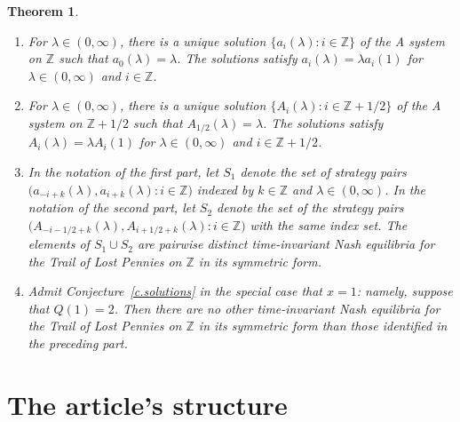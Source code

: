 \documentclass[letterpaper,11pt,oneside,reqno]{amsbook}
\newcommand{\Z}{\ensuremath{\mathbb{Z}}}
\newtheorem{theorem}{Theorem}[chapter]
\numberwithin{figure}{chapter}
\theoremstyle{definition}
\theoremstyle{definition}
\theoremstyle{definition}
\theoremstyle{definition}
\theoremstyle{definition}
\newcommand{\game}{{\rm Trail}}
\newcommand{\amacspace}{\textrm{A} }
\begin{document}
\begin{theorem}\label{t.symmetric}
\leavevmode
\begin{enumerate}
\item For $\lambda \in (0,\infty)$, there is a unique solution $\big\{ a_i(\lambda): i \in \Z \big\}$ of  the  \amacspace system on $\Z$ such that $a_0(\lambda) = \lambda$. The solutions satisfy $a_i(\lambda) = \lambda a_i(1)$
for $\lambda \in (0,\infty)$ and $i \in \Z$.
\item For $\lambda \in (0,\infty)$, there is a unique solution $\big\{ A_i(\lambda): i \in \Z + 1/2 \big\}$ of  the  \amacspace system on $\Z+1/2$ such that $A_{1/2}(\lambda) = \lambda$. The solutions satisfy $A_i(\lambda) = \lambda A_i(1)$
for $\lambda \in (0,\infty)$ and $i \in \Z + 1/2$.
 \item In the notation of the first part, let $S_1$ denote the set of strategy pairs $\big( a_{-i+k}(\lambda), a_{i+k}(\lambda) : i \in \Z \big)$ indexed by $k \in \Z$ and $\lambda \in (0,\infty)$.
 In the notation of the second part, let $S_2$ denote the set of the strategy pairs 
  $\big( A_{-i-1/2 +k}(\lambda) ,A_{i+1/2 + k}(\lambda): i \in \Z \big)$
  with the same index set. The elements of $S_1 \cup S_2$ are pairwise distinct time-invariant Nash equilibria for the Trail of Lost Pennies on $\Z$ in its symmetric form.  
  \item Admit Conjecture~\ref{c.solutions} in the special case that $x=1$: namely, suppose that $Q(1)=2$. Then there are no other time-invariant Nash equilibria  for the Trail of Lost Pennies on $\Z$ in its symmetric form than those identified in the preceding part.
\end{enumerate}
\end{theorem}

\section{The article's structure}
\end{document}
